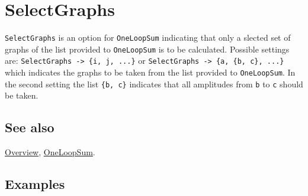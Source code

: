 \documentclass[../FeynCalcManual.tex]{subfiles}
\begin{document}
\hypertarget{selectgraphs}{%
\section{SelectGraphs}\label{selectgraphs}}

\texttt{SelectGraphs} is an option for \texttt{OneLoopSum} indicating
that only a slected set of graphs of the list provided to
\texttt{OneLoopSum} is to be calculated. Possible settings are:
\texttt{SelectGraphs -> \{\allowbreak{}i,\ \allowbreak{}j,\ \allowbreak{}...\}}
or
\texttt{SelectGraphs -> \{\allowbreak{}a,\ \allowbreak{}\{\allowbreak{}b,\ \allowbreak{}c\},\ \allowbreak{}...\}}
which indicates the graphs to be taken from the list provided to
\texttt{OneLoopSum}. In the second setting the list
\texttt{\{\allowbreak{}b,\ \allowbreak{}c\}} indicates that all
amplitudes from \texttt{b} to \texttt{c} should be taken.

\subsection{See also}

\hyperlink{toc}{Overview}, \hyperlink{oneloopsum}{OneLoopSum}.

\subsection{Examples}
\end{document}

